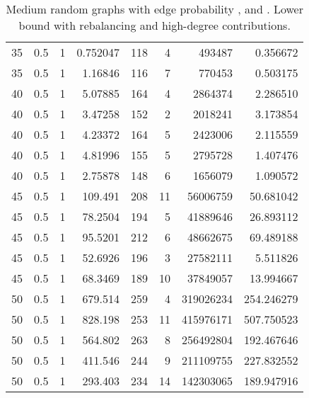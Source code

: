 \documentclass[a4paper,11pt]{article}
\begin{document}
\begin{table}
\begin{center}
\begin{tabular}{|rrr|r|r|rr|r|}
35 & 0.5 & 1 & 0.752047 & 118 & 4 & 493487 & 0.356672 \\
35 & 0.5 & 1 & 1.16846 & 116 & 7 & 770453 & 0.503175 \\
40 & 0.5 & 1 & 5.07885 & 164 & 4 & 2864374 & 2.286510 \\
40 & 0.5 & 1 & 3.47258 & 152 & 2 & 2018241 & 3.173854 \\
40 & 0.5 & 1 & 4.23372 & 164 & 5 & 2423006 & 2.115559 \\
40 & 0.5 & 1 & 4.81996 & 155 & 5 & 2795728 & 1.407476 \\
40 & 0.5 & 1 & 2.75878 & 148 & 6 & 1656079 & 1.090572 \\
45 & 0.5 & 1 & 109.491 & 208 & 11 & 56006759 & 50.681042 \\
45 & 0.5 & 1 & 78.2504 & 194 & 5 & 41889646 & 26.893112 \\
45 & 0.5 & 1 & 95.5201 & 212 & 6 & 48662675 & 69.489188 \\
45 & 0.5 & 1 & 52.6926 & 196 & 3 & 27582111 & 5.511826 \\
45 & 0.5 & 1 & 68.3469 & 189 & 10 & 37849057 & 13.994667 \\
50 & 0.5 & 1 & 679.514 & 259 & 4 & 319026234 & 254.246279 \\
50 & 0.5 & 1 & 828.198 & 253 & 11 & 415976171 & 507.750523 \\
50 & 0.5 & 1 & 564.802 & 263 & 8 & 256492804 & 192.467646 \\
50 & 0.5 & 1 & 411.546 & 244 & 9 & 211109755 & 227.832552 \\
50 & 0.5 & 1 & 293.403 & 234 & 14 & 142303065 & 189.947916 \\
\hline
\end{tabular}
\end{center}
\caption{Medium random graphs with edge probability ,
   and . Lower bound with rebalancing and
  high-degree contributions.}
\label{tab:medium-highdegree}
\end{table}
\end{document}
